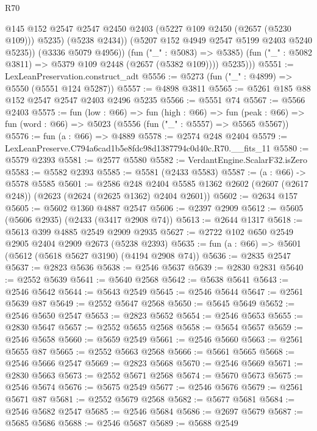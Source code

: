 \begin{lexlean}{R70}
\begin{coremodule}
                    @145
                    @152
                    @2547
                    @2547
                    @2450
                    @2403
                    (@5227 @109 @2450 (@2657 (@5230 @109)))
                    @5235)
                  (@5238 @2434))
                (@5207 @152 @4949 @2547 @5199 @2403 @5240 @5235))
              (@3336 @5079 @4956))
            (fun ("_" : @5083) => @5385)
            (fun ("_" : @5082 @3811) => @5379 @109 @2448 (@2657 (@5382 @109))))
          @5235)))
@5551 := LexLeanPreservation.construct_adt
@5556 := @5273 (fun ("_" : @4899) => @5550 (@5551 @124 @5287))
@5557 := @4898 @3811
@5565 := @5261 @185 @88 @152 @2547 @2547 @2403 @2496 @5235
@5566 := @5551 @74
@5567 := @5566 @2403
@5575 := fun (low : @66) =>
  fun (high : @66) =>
  fun (peak : @66) => fun (word : @66) => @5023 (@5556 (fun ("_" : @5557) => @5565 @5567))
@5576 := fun (a : @66) => @4889
@5578 := @2574 @248 @2404
@5579 := LexLeanPreserve.C794a6cad1b5e8fdc98d1387794c0d40c.R70.__fits_11
@5580 := @5579 @2393
@5581 := @2577 @5580
@5582 := VerdantEngine.ScalarF32.isZero
@5583 := @5582 @2393
@5585 := @5581 (@2433 @5583)
@5587 := (a : @66) -> @5578 @5585
@5601 := @2586
    @248
    @2404
    @5585
    @1362
    @2602
    (@2607 (@2617 @248))
    (@2623 (@2624 (@2625 @1362) @2404 @2601))
@5602 := @2634 @157
@5605 := @5602 @1360 @4887 @2547
@5606 := @2397 @2909
@5612 := @5605 (@5606 @2935) (@2433 (@3417 @2908 @74))
@5613 := @2644 @1317
@5618 := @5613 @399 @4885 @2549 @2909 @2935
@5627 := @2722 @102 @650 @2549 @2905 @2404 @2909 @2673 (@5238 @2393)
@5635 := fun (a : @66) => @5601 (@5612 (@5618 @5627 @3190) (@4194 @2908 @74))
@5636 := @2835 @2547
@5637 := @2823 @5636
@5638 := @2546 @5637
@5639 := @2830 @2831
@5640 := @2552 @5639
@5641 := @5640 @2568
@5642 := @5638 @5641
@5643 := @2546 @5642
@5644 := @5643 @2549
@5645 := @2546 @5644
@5647 := @2561 @5639 @87
@5649 := @2552 @5647 @2568
@5650 := @5645 @5649
@5652 := @2546 @5650 @2547
@5653 := @2823 @5652
@5654 := @2546 @5653
@5655 := @2830 @5647
@5657 := @2552 @5655 @2568
@5658 := @5654 @5657
@5659 := @2546 @5658
@5660 := @5659 @2549
@5661 := @2546 @5660
@5663 := @2561 @5655 @87
@5665 := @2552 @5663 @2568
@5666 := @5661 @5665
@5668 := @2546 @5666 @2547
@5669 := @2823 @5668
@5670 := @2546 @5669
@5671 := @2830 @5663
@5673 := @2552 @5671 @2568
@5674 := @5670 @5673
@5675 := @2546 @5674
@5676 := @5675 @2549
@5677 := @2546 @5676
@5679 := @2561 @5671 @87
@5681 := @2552 @5679 @2568
@5682 := @5677 @5681
@5684 := @2546 @5682 @2547
@5685 := @2546 @5684
@5686 := @2697 @5679
@5687 := @5685 @5686
@5688 := @2546 @5687
@5689 := @5688 @2549

\end{coremodule}
\end{lexlean}
